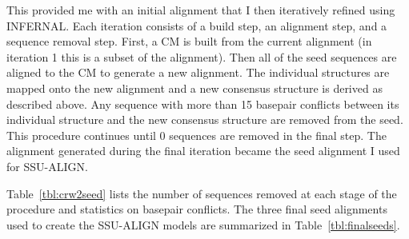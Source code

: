 This provided me with an initial alignment that I then iteratively
refined using INFERNAL. Each iteration consists of a build
step, an alignment step, and a sequence removal step. First, a CM is
built from the current alignment (in iteration 1 this is a subset of
the  alignment). Then all of the seed sequences are aligned to the
CM to generate a new alignment. The individual structures are mapped
onto the new alignment and a new consensus structure is derived as
described above.  Any sequence with more than 15 basepair conflicts
between its individual structure and the new consensus structure are
removed from the seed.  This procedure continues until 0 sequences are
removed in the final step. The alignment generated during the final
iteration became the seed alignment I used for SSU-ALIGN.

Table~\ref{tbl:crw2seed} lists the number of sequences removed at each
stage of the procedure and statistics on basepair conflicts. 
The three final seed alignments used to create the SSU-ALIGN 
models are summarized in Table~\ref{tbl:finalseeds}.


